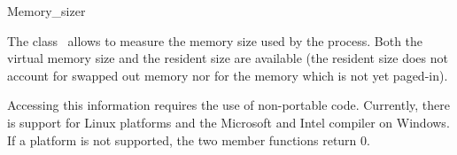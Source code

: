 
\begin{ccRefClass}{Memory_sizer}

\ccDefinition

The class \ccRefName\ allows to measure the memory size used by the process.
Both the virtual memory size and the resident size are available (the resident
size does not account for swapped out memory nor for the memory which is not
yet paged-in).


\ccTypes
\ccThreeToTwo


\ccCreation

\ccPropagateThreeToTwoColumns


\ccOperations

\ccGlue
{}


\ccImplementation

Accessing this information requires the use of non-portable code.
Currently, there is support for Linux platforms and the Microsoft and Intel
compiler on Windows.  If a platform is not supported, the two member
functions return 0.

\end{ccRefClass}
